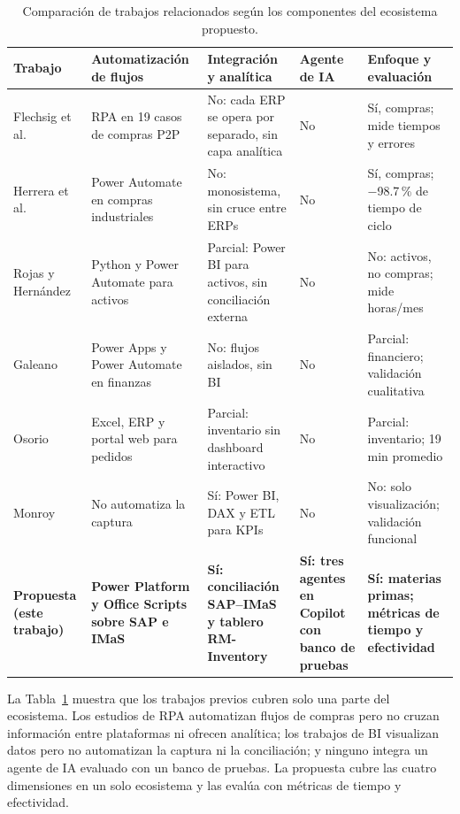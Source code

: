 \begin{table}[H]
  \centering
  \caption{Comparación de trabajos relacionados según los componentes del ecosistema propuesto.}
  \label{tab:comparativa_antecedentes}
  \small
  \begin{tabular}{@{}p{2.6cm}p{3.0cm}p{3.1cm}p{2.2cm}p{3.1cm}@{}}
    \toprule
    \textbf{Trabajo} &
    \textbf{Automatización de flujos} &
    \textbf{Integración y analítica} &
    \textbf{Agente de IA} &
    \textbf{Enfoque y evaluación} \\
    \midrule
    Flechsig et al. \cite{flechsig2022rpa} &
    RPA en 19 casos de compras P2P &
    No: cada ERP se opera por separado, sin capa analítica &
    No &
    Sí, compras; mide tiempos y errores \\
    \addlinespace
    Herrera et al. \cite{herrera2025rpa} &
    Power Automate en compras industriales &
    No: monosistema, sin cruce entre ERPs &
    No &
    Sí, compras; $-$98.7\,\% de tiempo de ciclo \\
    \addlinespace
    Rojas y Hernández \cite{rojas2025mejora} &
    Python y Power Automate para activos &
    Parcial: Power BI para activos, sin conciliación externa &
    No &
    No: activos, no compras; mide horas/mes \\
    \addlinespace
    Galeano \cite{galeano2025automatizacion} &
    Power Apps y Power Automate en finanzas &
    No: flujos aislados, sin BI &
    No &
    Parcial: financiero; validación cualitativa \\
    \addlinespace
    Osorio \cite{osorio2026interoperable} &
    Excel, ERP y portal web para pedidos &
    Parcial: inventario sin dashboard interactivo &
    No &
    Parcial: inventario; 19 min promedio \\
    \addlinespace
    Monroy \cite{monroy2026tablero} &
    No automatiza la captura &
    Sí: Power BI, DAX y ETL para KPIs &
    No &
    No: solo visualización; validación funcional \\
    \addlinespace
    \textbf{Propuesta (este trabajo)} &
    \textbf{Power Platform y Office Scripts sobre SAP e IMaS} &
    \textbf{Sí: conciliación SAP--IMaS y tablero RM-Inventory} &
    \textbf{Sí: tres agentes en Copilot con banco de pruebas} &
    \textbf{Sí: materias primas; métricas de tiempo y efectividad} \\
    \bottomrule
  \end{tabular}
\end{table}
 
La Tabla~\ref{tab:comparativa_antecedentes} muestra que los trabajos previos cubren solo una parte del ecosistema. Los estudios de RPA \cite{flechsig2022rpa,herrera2025rpa} automatizan flujos de compras pero no cruzan información entre plataformas ni ofrecen analítica; los trabajos de
BI \cite{rojas2025mejora,monroy2026tablero} visualizan datos pero no automatizan la captura ni la conciliación; y ninguno integra un agente de IA evaluado con un banco de pruebas. La propuesta cubre las cuatro dimensiones en un solo ecosistema y las evalúa con métricas de tiempo y efectividad.